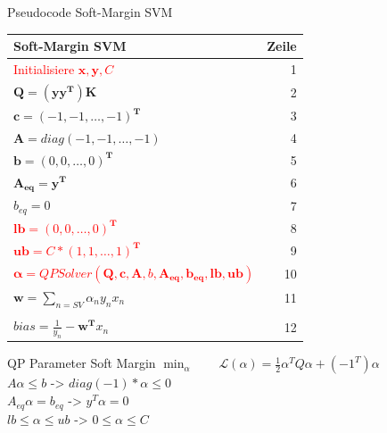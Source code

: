 \documentclass[ngerman]{beamer}
\newcommand{\Lagr}{\mathcal{L}}
\begin{document}
\begin{frame}{Pseudocode Soft-Margin SVM}
    \centering
    \begin{tabular}{l r}
        \textbf{Soft-Margin SVM} & \textbf{Zeile} \\
        \hline
        \textcolor{red}{Initialisiere $\mathbf{x}, \mathbf{y}, C$ }& 1\\ \pause
        $\mathbf{Q} = (\mathbf{y}\mathbf{y}^{\mathbf{T}})\mathbf{K}$ & 2\\
        $\mathbf{c} = \left( -1, -1, \ldots, -1 \right)^{\mathbf{T}}$ & 3 \\
        $\mathbf{A} = diag\left( -1, -1, \ldots, -1 \right)$ & 4 \\
        $\mathbf{b} = \left( 0, 0, \ldots, 0 \right)^{\mathbf{T}}$ & 5\\
        $\mathbf{A_{eq}} = \mathbf{y}^{\mathbf{T}}$ & 6\\
        $b_{eq} = 0$ & 7\\ \pause
        \textcolor{red}{$\mathbf{lb} = \left( 0, 0, \ldots, 0 \right)^{\mathbf{T}}$} & 8 \\
        \textcolor{red}{$\mathbf{ub} = C * \left( 1, 1, \ldots, 1 \right)^{\mathbf{T}}$} & 9 \\ \pause
        \textcolor{red}{$\mathbf{\alpha} = QPSolver\left( \mathbf{Q}, \mathbf{c}, \mathbf{A}, b, \mathbf{A_{eq}}, \mathbf{b_{eq}}, \mathbf{lb}, \mathbf{ub} \right)$} & 10\\ \pause
        $\mathbf{w} = \sum\limits_{n=SV} \alpha_{n} y_{n} x_{n}$  & 11\\
        & \\[-1em]
        $bias = \frac{1}{y_{n}} - \mathbf{w}^{\mathbf{T}}x_{n}$ & 12\\
    \end{tabular}
\end{frame}

\begin{frame}{QP Parameter Soft Margin}
    \centering
    $\!\min_{\alpha} \qquad \Lagr(\alpha) = \frac{1}{2} \alpha^{T} Q \alpha + (-1^T) \alpha$ \\ \pause
    $A \alpha \leq b$ -> $diag(-1) * \alpha \leq 0$ \\ \pause
    $A_{e q} \alpha = b_{e q}$ -> $y^{T} \alpha = 0$ \\ \pause
    $lb \leq \alpha \leq ub$ -> $0 \leq \alpha \leq C$
\end{frame}
\end{document}
